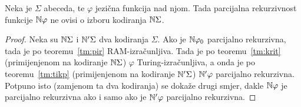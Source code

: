\begin{korolar}\label{kor:ikojiNSigma}
Neka je $\Sigma$ abeceda, te $\varphi$ jezična funkcija nad njom. Tada parcijalna rekurzivnost funkcije ${\mathbb N}\varphi$ ne ovisi o izboru kodiranja ${\mathbb N}\Sigma$.
\end{korolar}
\begin{proof}
Neka su ${\mathbb N}\Sigma$ i ${\mathbb N}'\Sigma$ dva kodiranja $\Sigma$. Ako je ${\mathbb N}\varphi_0$ parcijalno rekurzivna, tada je po teoremu~\ref{tm:pir} RAM-izračunljiva. Tada je po teoremu~\ref{tm:krit} (primijenjenom na kodiranje ${\mathbb N}\Sigma$) $\varphi$ Turing-izračunljiva, a onda je po teoremu~\ref{tm:tikp} (primijenjenom na kodiranje ${\mathbb N}'\Sigma$) ${\mathbb N}'\varphi$ parcijalno rekurzivna. Potpuno isto (zamjenom ta dva kodiranja) se dokaže drugi smjer, dakle ${\mathbb N}\varphi$ je parcijalno rekurzivna ako i samo ako je ${\mathbb N}'\varphi$ parcijalno rekurzivna.
\end{proof}

